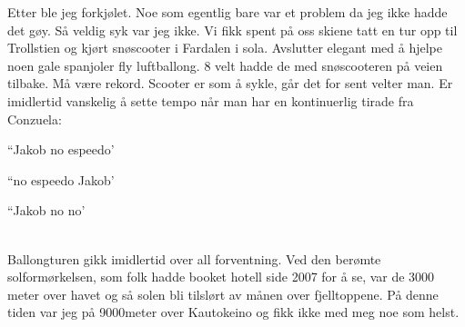 Etter
ble jeg forkjølet. Noe som egentlig bare var et problem da jeg ikke
hadde det gøy. Så veldig syk var jeg ikke. Vi fikk spent på oss skiene
tatt en tur opp til Trollstien og kjørt snøscooter
i Fardalen i sola. Avslutter elegant med å  hjelpe noen gale spanjoler
fly luftballong. 8 velt hadde de med snøscooteren på veien tilbake. Må
være rekord. Scooter er som å sykle, går det for sent velter man. Er
imidlertid vanskelig å sette tempo når man har en kontinuerlig tirade
fra Conzuela:
\begin{dialogue}
	\item ``Jakob no espeedo'
	\item ``no espeedo Jakob'
	\item ``Jakob no no'
\end{dialogue}
\\

Ballongturen gikk imidlertid over all forventning. Ved den berømte
solformørkelsen, som folk hadde booket hotell side 2007 for å se, var
de 3000 meter over havet og så solen bli tilslørt av månen over
fjelltoppene. På denne tiden var
jeg på 9000meter over Kautokeino og fikk ikke med meg noe som helst. 

